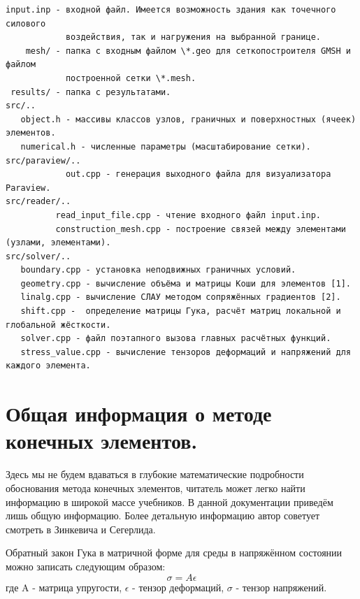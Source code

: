 \documentclass[a4paper,12pt]{article}
\begin{document}
\begin{small}
\begin{verbatim}	
input.inp - входной файл. Имеется возможность здания как точечного силового 
            воздействия, так и нагружения на выбранной границе.
    mesh/ - папка с входным файлом \*.geo для сеткопостроителя GMSH и файлом 
            построенной сетки \*.mesh.
 results/ - папка с результатами.
src/..
   object.h - массивы классов узлов, граничных и поверхностных (ячеек) элементов.
   numerical.h - численные параметры (масштабирование сетки).
src/paraview/..
            out.cpp - генерация выходного файла для визуализатора Paraview.          
src/reader/..
          read_input_file.cpp - чтение входного файл input.inp. 
          construction_mesh.cpp - построение связей между элементами (узлами, элементами).
src/solver/..
   boundary.cpp - установка неподвижных граничных условий.
   geometry.cpp - вычисление объёма и матрицы Коши для элементов [1].
   linalg.cpp - вычисление СЛАУ методом сопряжённых градиентов [2].
   shift.cpp -  определение матрицы Гука, расчёт матриц локальной и глобальной жёсткости.
   solver.cpp - файл поэтапного вызова главных расчётных функций.
   stress_value.cpp - вычисление тензоров деформаций и напряжений для каждого элемента.
\end{verbatim}
\end{small}  
	
\section{Общая информация о методе конечных элементов.}
	
   	Здесь мы не будем вдаваться в глубокие математические подробности обоснования метода конечных элементов, читатель может легко найти информацию в широкой массе учебников. В данной документации приведём лишь общую информацию. Более детальную информацию автор советует смотреть в Зинкевича и Сегерлида.
   	
	Обратный закон Гука в матричной форме для среды в напряжённом состоянии можно записать следующим образом:
	\begin{equation}
	\sigma = A \epsilon
	\end{equation}
	где A - матрица упругости, $\epsilon$ - тензор деформаций, $\sigma$ - тензор напряжений.	
	
\end{document}
